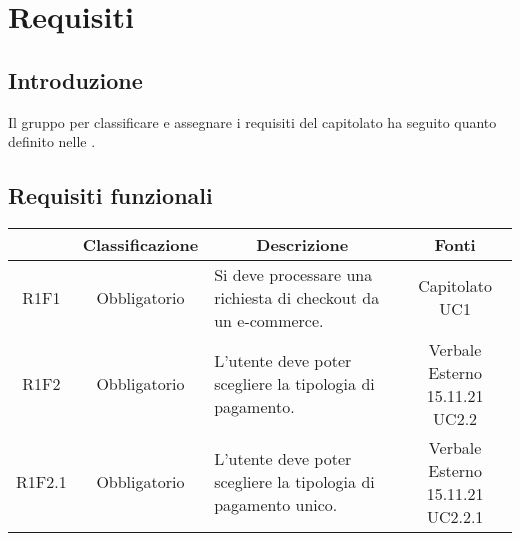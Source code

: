 \section{Requisiti} \label{section:requisiti}

\subsection{Introduzione}
Il gruppo \groupName{} per classificare e assegnare i requisiti del capitolato ha seguito quanto definito nelle \docNameVersionNdP{}.

\subsection{Requisiti funzionali} \label{subsection:requisiti_funzionali}
\begin{table}[H]
    \centering
    \renewcommand{\arraystretch}{1.8}
    \begin{tabular}{c | c | p{6cm} | c }
        \rowcolor[HTML]{125E28}
        \multicolumn{1}{c}{\color[HTML]{FFFFFF} \textbf{Codice}}          &
        \multicolumn{1}{c}{\color[HTML]{FFFFFF} \textbf{Classificazione}} &
        \multicolumn{1}{c}{\color[HTML]{FFFFFF} \textbf{Descrizione}}     &
        \multicolumn{1}{c}{\color[HTML]{FFFFFF} \textbf{Fonti}}                                                                                                                                                                  \\
        \hline
        R1F1                                                              & Obbligatorio & Si deve processare una richiesta di checkout da un e-commerce\glo{}.                          & \Shortunderstack{Capitolato\\UC1\\}                        \\
        R1F2                                                              & Obbligatorio & L'utente deve poter scegliere la tipologia di pagamento.                                      & \Shortunderstack{Verbale Esterno 15.11.21\\UC2.2\\}        \\
        R1F2.1                                                            & Obbligatorio & L'utente deve poter scegliere la tipologia di pagamento unico.                                & \Shortunderstack{Verbale Esterno 15.11.21\\UC2.2.1\\}      \\

\end{tabular}
\end{table}
